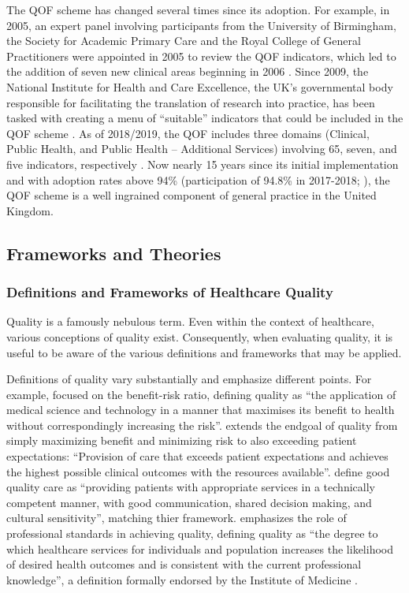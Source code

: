 \documentclass[12pt]{article}
\begin{document}
The QOF scheme has changed several times since its adoption. For example, in 2005, an expert panel involving participants from the University of Birmingham, the Society for Academic Primary Care and the Royal College of General Practitioners were appointed in 2005 to review the QOF indicators, which led to the addition of seven new clinical areas beginning in 2006 \citep{lesterQualityOutcomesFramework2006}. Since 2009, the National Institute for Health and Care Excellence, the UK's governmental body responsible for facilitating the translation of research into practice, has been tasked with creating a menu of ``suitable'' indicators that could be included in the QOF scheme \citep{sutcliffeNICEQualityOutcomes2012a}. As of 2018/2019, the QOF includes three domains (Clinical, Public Health, and Public Health -- Additional Services) involving 65, seven, and five indicators, respectively \citep{QOF201819}. Now nearly 15 years since its initial implementation and with adoption rates above 94\% (participation of 94.8\% in 2017-2018; \citep{QualityOutcomesFramework}), the QOF scheme is a well ingrained component of general practice in the United Kingdom.



\subsection{Frameworks and Theories}

\subsubsection{Definitions and Frameworks of Healthcare Quality}

Quality is a famously nebulous term. Even within the context of healthcare, various conceptions of quality exist. Consequently, when evaluating quality, it is useful to be aware of the various definitions and frameworks that may be applied.

Definitions of quality vary substantially and emphasize different points. For example, \citep{donabedianExplorationsQualityAssessment1980} focused on the benefit-risk ratio, defining quality as ``the application of medical science and technology in a manner that maximises its benefit to health without correspondingly increasing the risk''. \citet{ovretveitHealthServiceQuality1992} extends the endgoal of quality from simply maximizing benefit and minimizing risk to also exceeding patient expectations: ``Provision of care that exceeds patient expectations and achieves the highest possible clinical outcomes with the resources available''. \citet{schusterHowGoodQuality1998} define good quality care as ``providing patients with appropriate services in a technically competent manner, with good communication, shared decision making, and cultural sensitivity'', matching thier framework. \citet{lohrMedicareStrategyQuality1990} emphasizes the role of professional standards in achieving quality, defining quality as ``the degree to which healthcare services for individuals and population increases the likelihood of desired health outcomes and is consistent with the current professional knowledge'', a definition formally endorsed by the Institute of Medicine \citep{schusterHowGoodQuality1998}.
\end{document}
